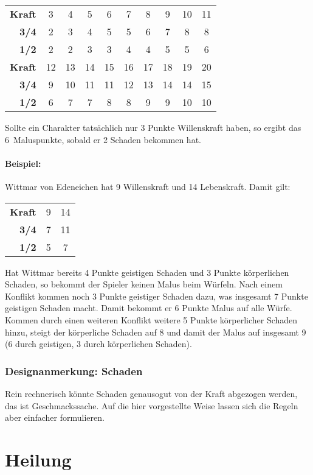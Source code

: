 \begin{tabular}[C]{>{\bf}r*9c}
Kraft & 3 & 4 & 5 & 6 & 7 & 8 & 9 & 10 & 11 \\
3/4 & 2 & 3 & 4 & 5 & 5 & 6 & 7 & 8 & 8 \\
1/2 & 2 & 2 & 3 & 3 & 4 & 4 & 5 & 5 & 6 \\[\medskipamount]
Kraft & 12 & 13 & 14 & 15 & 16 & 17 & 18 & 19 & 20 \\
3/4 & 9 &10 &11 &11 &12 &13 &14 &14 &15 \\
1/2 & 6 & 7 & 7 & 8 & 8 & 9 & 9 &10 &10 \\
\end{tabular}
Sollte ein Charakter tatsächlich nur 3 Punkte Willenskraft haben, so ergibt das 6~Maluspunkte, sobald er 2 Schaden bekommen hat.

\begin{beispiel}
\paragraph{Beispiel:} Wittmar von Edeneichen hat 9 Willenskraft und 14 Lebenskraft. Damit gilt:
\begin{tabular}[C]{rcc}
	\bf Kraft & 9  & 14 \\
	\bf 3/4   & 7  & 11 \\
	\bf 1/2   & 5  & 7  \\
\end{tabular}
Hat Wittmar bereits 4 Punkte geistigen Schaden und 3 Punkte körperlichen Schaden, so bekommt der Spieler keinen Malus beim Würfeln. Nach einem Konflikt kommen noch 3 Punkte geistiger Schaden dazu, was insgesamt 7 Punkte geistigen Schaden macht. Damit bekommt er 6 Punkte Malus auf alle Würfe. Kommen durch einen weiteren Konflikt weitere 5 Punkte körperlicher Schaden hinzu, steigt der körperliche Schaden auf 8 und damit der Malus auf insgesamt 9 (6 durch geistigen, 3 durch körperlichen Schaden).
\end{beispiel}

\begin{design}
\subsubsection{Designanmerkung: Schaden}
Rein rechnerisch könnte Schaden genausogut von der Kraft abgezogen werden, das ist Geschmackssache. Auf die hier vorgestellte Weise lassen sich die Regeln aber einfacher formulieren.
\end{design}

\section{Heilung}

